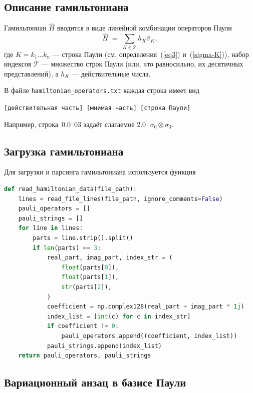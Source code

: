 \documentclass[a4paper]{report}
\begin{document}
\subsection{Описание гамильтониана}

Гамильтониан $\hat{H}$ вводится в виде линейной комбинации операторов Паули
\begin{equation}\label{ham-pauli}
\hat{H}\;=\; \sum\limits_{K\in\mathcal{T}}h_K\hat{\sigma}_{K},
\end{equation}
где $K=k_1\ldots k_n$ --- строка Паули (см. определения~(\ref{eq3}) и~(\ref{sigma-K})), набор индексов $\mathcal{T}$ --- множество строк Паули (или, что равносильно, их десятичных представлений), а $h_K$ --- действительные числа.

В файле \texttt{hamiltonian\_operators.txt} каждая строка имеет вид
\begin{center}
\texttt{[действительная часть] [мнимая часть] [строка Паули]}
\end{center}
Например, строка\, 0.0\, 03\; задаёт слагаемое $2.0 \cdot \sigma_0 \otimes \sigma_3$.

\subsection{Загрузка гамильтониана}

Для загрузки и парсинга гамильтониана используется функция

\begin{lstlisting}[language=Python]
def read_hamiltonian_data(file_path):
    lines = read_file_lines(file_path, ignore_comments=False)
    pauli_operators = []
    pauli_strings = []
    for line in lines:
        parts = line.strip().split()
        if len(parts) == 3:
            real_part, imag_part, index_str = (
                float(parts[0]),
                float(parts[1]),
                str(parts[2]),
            )
            coefficient = np.complex128(real_part + imag_part * 1j)
            index_list = [int(c) for c in index_str]
            if coefficient != 0:
                pauli_operators.append((coefficient, index_list))
            pauli_strings.append(index_list)
    return pauli_operators, pauli_strings
\end{lstlisting}

\subsection{Вариационный анзац в базисе Паули}
\end{document}
